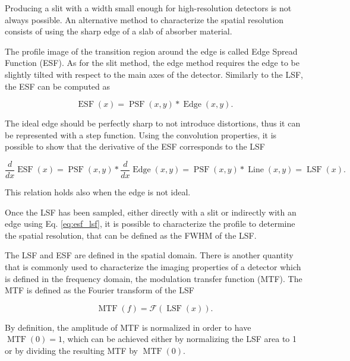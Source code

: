Producing a slit with a width small enough for high-resolution detectors is not always possible. An alternative method to characterize the spatial resolution consists of using the sharp edge of a slab of absorber material.

The profile image of the transition region around the edge is called Edge Spread Function (ESF). As for the slit method, the edge method requires the edge to be slightly tilted with respect to the main axes of the detector. Similarly to the LSF, the ESF can be computed as

\begin{equation}
\operatorname{ESF}(x) = \operatorname{PSF}(x, y) \ast \operatorname{Edge}(x, y).
\end{equation}

The ideal edge should be perfectly sharp to not introduce distortions, thus it can be represented with a step function. Using the convolution properties, it is possible to show that the derivative of the ESF corresponds to the LSF

\begin{equation}
\frac{d}{dx} \operatorname{ESF}(x) = \operatorname{PSF}(x, y) \ast \frac{d}{dx} \operatorname{Edge}(x, y) = \operatorname{PSF}(x, y) \ast \operatorname{Line}(x, y) = \operatorname{LSF}(x).
\label{eq:esf_lsf}
\end{equation}

This relation holds also when the edge is not ideal.

Once the LSF has been sampled, either directly with a slit or indirectly with an edge using Eq. \ref{eq:esf_lsf}, it is possible to characterize the profile to determine the spatial resolution, that can be defined as the FWHM of the LSF.

The LSF and ESF are defined in the spatial domain. There is another quantity that is commonly used to characterize the imaging properties of a detector which is defined in the frequency domain, the modulation transfer function (MTF). The MTF is defined as the Fourier transform of the LSF

\begin{equation}
\operatorname{MTF}(f) = \mathcal{F}(\operatorname{LSF}(x)).
\label{eq:mtf}
\end{equation}

By definition, the amplitude of MTF is normalized in order to have $\operatorname{MTF}(0) = 1$, which can be achieved either by normalizing the LSF area to 1 or by dividing the resulting MTF by $\operatorname{MTF}(0)$.

